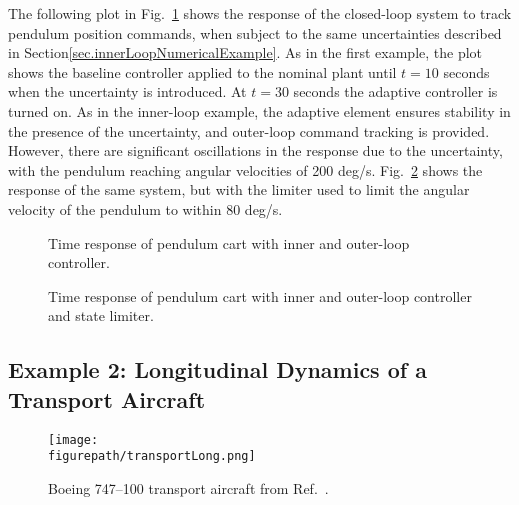 The following plot in Fig.~\ref{fig.outerLoopPendulumCart} shows the response of the closed-loop system to track pendulum position commands, when subject to the same uncertainties described in Section\ref{sec.innerLoopNumericalExample}.
As in the first example, the plot shows the baseline controller applied to the nominal plant until $t=10$ seconds when the uncertainty is introduced.
At $t=30$ seconds the adaptive controller is turned on.
As in the inner-loop example, the adaptive element ensures stability in the presence of the uncertainty, and outer-loop command tracking is provided.
However, there are significant oscillations in the response due to the uncertainty, with the pendulum reaching angular velocities of 200 deg/s.
Fig.~\ref{fig.outerLoopStateLimiterPendulumCart} shows the response of the same system, but with the limiter used to limit the angular velocity of the pendulum to within 80 deg/s.

\newpage
\begin{figure}[H]
  \hspace{-0.25in}
  \noindent{}
  \vspace{-0.95in}
  \caption{Time response of pendulum cart with inner and outer-loop controller.\label{fig.outerLoopPendulumCart}}
\end{figure}

\newpage
\begin{figure}[H]
  \hspace{-0.25in}
  \noindent{}
  \vspace{-0.95in}
  \caption{Time response of pendulum cart with inner and outer-loop controller and state limiter.\label{fig.outerLoopStateLimiterPendulumCart}}
\end{figure}

\subsection{Example 2: Longitudinal Dynamics of a Transport Aircraft}

\begin{figure}[H]
  \begin{center}
    \texttt{[image: \\figurepath/transportLong.png]}
    \vspace{-0.1in}
    \caption{Boeing 747--100 transport aircraft from Ref.\ \cite{nelson.flightcontrol.1998}.\label{fig.transportLong}}
  \end{center}
\end{figure}

